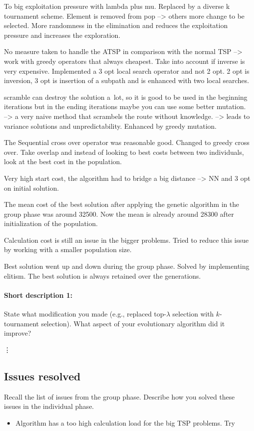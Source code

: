 \documentclass[a4paper,10pt]{article}
\newcommand{\ReplaceMe}[1]{{\color{blue}#1}}
\begin{document}
To big exploitation pressure with lambda plus mu. Replaced by a diverse k tournament scheme. Element is removed from pop --> others more change to be selected. More randomness in the elimination and reduces the exploitation pressure and increases the exploration. 

No measure taken to handle the ATSP in comparison with the normal TSP --> work with greedy operators that always cheapest. Take into account if inverse is very expensive. Implemented a 3 opt local search operator and not 2 opt. 2 opt is inversion, 3 opt is insertion of a subpath and is enhanced with two local searches. 

scramble can destroy the solution a lot, so it is good to be used in the beginning iterations but in the ending iterations maybe you can use some better mutation. --> a very naive method that scrambels the route without knowledge. --> leads to variance solutions and unpredictability. Enhanced by greedy mutation. 

The Sequential cross over operator was reasonable good. Changed to greedy cross over. Take overlap and instead of looking to best costs between two individuals, look at the best cost in the population. 

Very high start cost, the algorithm had to bridge a big distance --> NN and 3 opt on initial solution.

The mean cost of the best solution after applying the genetic algorithm in the group phase was around 32500. Now the mean is already around 28300 after initialization of the population. 

Calculation cost is still an issue in the bigger problems. Tried to reduce this issue by working with a smaller population size. 

Best solution went up and down during the group phase. Solved by implementing elitism. The best solution is always retained over the generations.

\paragraph{Short description 1:} \ReplaceMe{State what modification you made (e.g., replaced top-$\lambda$ selection with $k$-tournament selection). What aspect of your evolutionary algorithm did it improve?} 

\vdots


\subsection{Issues resolved}
\ReplaceMe{Recall the list of issues from the group phase. Describe how you solved these issues in the individual phase.}
\begin{itemize}
	\item Algorithm has a too high calculation load for the big TSP problems. Try 
\end{itemize}
\end{document}
